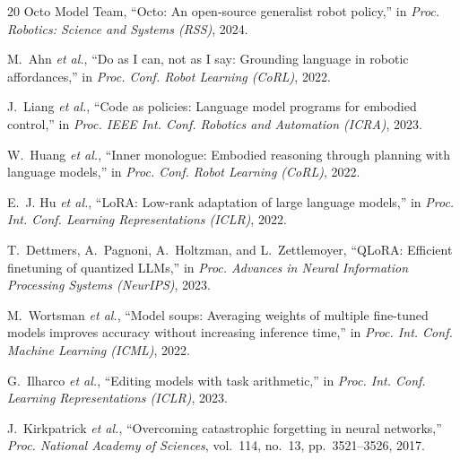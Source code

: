 \documentclass[conference]{IEEEtran}
\begin{document}
\begin{thebibliography}{20}
Octo Model Team,
``Octo: An open-source generalist robot policy,''
in \emph{Proc. Robotics: Science and Systems (RSS)}, 2024.

M.~Ahn \emph{et al.},
``Do as I can, not as I say: Grounding language in robotic
affordances,''
in \emph{Proc. Conf. Robot Learning (CoRL)}, 2022.

J.~Liang \emph{et al.},
``Code as policies: Language model programs for embodied control,''
in \emph{Proc. IEEE Int. Conf. Robotics and Automation (ICRA)}, 2023.

W.~Huang \emph{et al.},
``Inner monologue: Embodied reasoning through planning with language
models,''
in \emph{Proc. Conf. Robot Learning (CoRL)}, 2022.

E.~J. Hu \emph{et al.},
``LoRA: Low-rank adaptation of large language models,''
in \emph{Proc. Int. Conf. Learning Representations (ICLR)}, 2022.

T.~Dettmers, A.~Pagnoni, A.~Holtzman, and L.~Zettlemoyer,
``QLoRA: Efficient finetuning of quantized LLMs,''
in \emph{Proc. Advances in Neural Information Processing Systems
(NeurIPS)}, 2023.

M.~Wortsman \emph{et al.},
``Model soups: Averaging weights of multiple fine-tuned models improves
accuracy without increasing inference time,''
in \emph{Proc. Int. Conf. Machine Learning (ICML)}, 2022.

G.~Ilharco \emph{et al.},
``Editing models with task arithmetic,''
in \emph{Proc. Int. Conf. Learning Representations (ICLR)}, 2023.

J.~Kirkpatrick \emph{et al.},
``Overcoming catastrophic forgetting in neural networks,''
\emph{Proc. National Academy of Sciences}, vol.~114, no.~13,
pp.~3521--3526, 2017.

\end{thebibliography}
\end{document}
